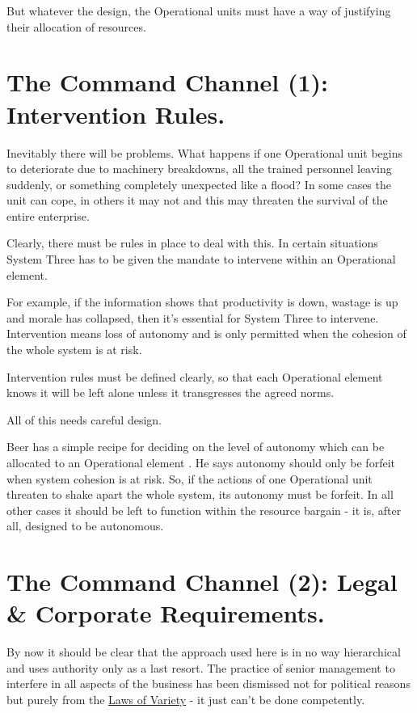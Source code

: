 But whatever the design, the Operational units must have a way of justifying their allocation of resources.

\section*{The Command Channel (1): Intervention Rules.}
Inevitably there will be problems. What happens if one Operational unit begins to deteriorate due to machinery breakdowns, all the trained personnel leaving suddenly, or something completely unexpected like a flood? In some cases the unit can cope, in others it may not and this may threaten the survival of the entire enterprise.

Clearly, there must be rules in place to deal with this. In certain situations System Three has to be given the mandate to intervene within an Operational element.

For example, if the information shows that productivity is down, wastage is up and morale has collapsed, then it's essential for System Three to intervene. Intervention means loss of autonomy and is only permitted when the cohesion of the whole system is at risk.

Intervention rules must be defined clearly, so that each Operational element knows it will be left alone unless it transgresses the agreed norms.

All of this needs careful design.

Beer has a simple recipe for deciding on the level of autonomy which can be allocated to an Operational element . He says autonomy should only be forfeit when system cohesion is at risk. So, if the actions of one Operational unit threaten to shake apart the whole system, its autonomy must be forfeit. In all other cases it should be left to function within the resource bargain - it is, after all, designed to be autonomous.

\section*{The Command Channel (2): Legal \& Corporate Requirements.}
By now it should be clear that the approach used here is in no way hierarchical and uses authority only as a last resort. The practice of senior management to interfere in all aspects of the business has been dismissed not for political reasons but purely from the \href{https://vsmg.lrc.org.uk/screen.php?page=variety}{Laws of Variety} - it just can't be done competently.

